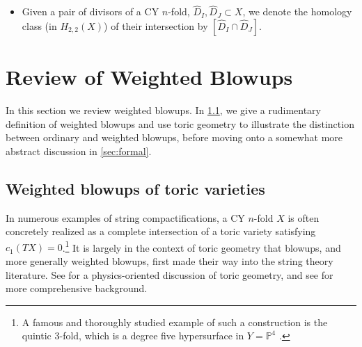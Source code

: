 \documentclass[11pt,oneside,english]{article}
\numberwithin{equation}{section}
\theoremstyle{definition}
\begin{document}
\begin{itemize}
  \item Given a pair of divisors of a CY $n$-fold, $\hat D_I, \hat D_J \subset X$, we denote the homology class (in $H_{2,2}(X)$) of their intersection by $[\hat D_I \cap \hat D_J]$. 
\end{itemize}

\section{Review of Weighted Blowups}

In this section we review weighted blowups. In \cref{sec:toricweighted}, we give a rudimentary definition of weighted blowups and use toric geometry to illustrate the distinction between ordinary and weighted blowups, before moving onto a somewhat more abstract discussion in \cref{sec:formal}.


\label{sec:review}
\subsection{Weighted blowups of toric varieties}
\label{sec:toricweighted}
In numerous examples of string compactifications, a CY $n$-fold $X$ is often concretely realized as a complete intersection of a toric variety satisfying $c_1(TX) =0$.\footnote{A famous and thoroughly studied example of such a construction is the quintic 3-fold, which is a degree five hypersurface in $Y = \mathbb P^4$ \cite{Candelas:1990rm}.} It is largely in the context of toric geometry that blowups, and more generally weighted blowups, first made their way into the string theory literature. See \cite{hori2003mirror} for a physics-oriented discussion of toric geometry, and see \cite{7d3c9f5cc0d546b3a3c103df4d4cb4f5} for more comprehensive background.
\end{document}
